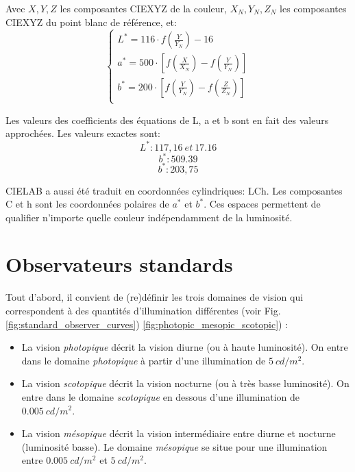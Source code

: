 	\par Avec $X, Y, Z$ les composantes CIEXYZ de la couleur, $X_N, Y_N, Z_N$ les composantes CIEXYZ du point blanc de référence, et:
	\begin{equation}
		\begin{cases}
		L^\ast=116 \cdot f(\frac{Y}{Y_N})-16\\
		a^\ast=500 \cdot \left[f(\frac{X}{X_N})-f(\frac{Y}{Y_N})\right]\\
		b^\ast=200 \cdot \left[f(\frac{Y}{Y_N})-f(\frac{Z}{Z_N})\right]\\
		\end{cases}
	\end{equation}
	
	\par Les valeurs des coefficients des équations de L, a et b sont en fait des valeurs approchées. Les valeurs exactes sont: \[L^\ast: 117,16~et~17.16\] \[b^\ast: 509.39\] \[b^\ast: 203,75\]
	
	\par CIELAB a aussi été traduit en coordonnées cylindriques: LCh. Les composantes C et h sont les coordonnées polaires de $a^\ast$ et $b^\ast$. Ces espaces permettent de qualifier n'importe quelle couleur indépendamment de la luminosité. 
		
	\section{Observateurs standards}
	\par Tout d'abord, il convient de (re)définir les trois domaines de vision qui correspondent à des quantités d'illumination différentes (voir Fig. \ref{fig:standard_observer_curves}) \ref{fig:photopic_mesopic_scotopic}) \citep{damelincourt_eclairage_2010}:
	\begin{itemize}
		\item La vision \textit{photopique} décrit la vision diurne (ou à haute luminosité). On entre dans le domaine \textit{photopique} à partir d'une illumination de $5~cd/m^2$.
		\item La vision \textit{scotopique} décrit la vision nocturne (ou à très basse luminosité). On entre dans le domaine \textit{scotopique} en dessous d'une illumination de $0.005~cd/m^2$.
		\item La vision \textit{mésopique} décrit la vision intermédiaire entre diurne et nocturne (luminosité basse). Le domaine \textit{mésopique} se situe pour une illumination entre $0.005~cd/m^2$ et $5~cd/m^2$.	
	\end{itemize}
	
